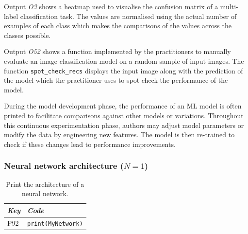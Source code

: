 Output \emph{O3} shows a heatmap used to visualise the confusion matrix of a multi-label classification task. The values are normalised using the actual number of examples of each class which makes the comparisons of the values across the classes possible.

Output \emph{O52} shows a function implemented by the practitioners to manually evaluate an image classification model on a random sample of input images. The function \texttt{spot\_check\_recs} displays the input image along with the prediction of the model which the practitioner uses to spot-check the performance of the model.

During the model development phase, the performance of an ML model is often printed to facilitate comparisons against other models or variations. Throughout this continuous experimentation phase, authors may adjust model parameters or modify the data by engineering new features. The model is then re-trained to check if these changes lead to performance improvements.


\subsubsection{Neural network architecture ($N = 1$)}

\begin{table}
  \centering
  \caption{Print the architecture of a neural network.}
  \begin{tabular}{@{}m{} m{}@{}}
    \toprule
    \emph{\textbf{Key}}&
    \emph{\textbf{Code}}\\
    \midrule
    P92&
    \lstinline[]$print(MyNetwork)$\\
    \bottomrule
  \end{tabular}
  \label{tab:network-architecture}
\end{table}

